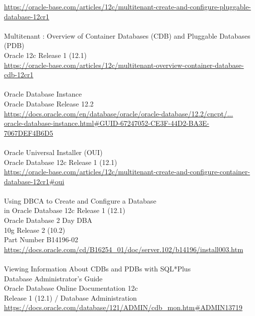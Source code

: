\href{https://oracle-base.com/articles/12c/multitenant-create-and-configure-pluggable-database-12cr1}{https://oracle-base.com/articles/12c/multitenant-create-and-configure-pluggable-database-12cr1}\\
\\
Multitenant : Overview of Container Databases (CDB) and Pluggable Databases (PDB)\\
Oracle 12c Release 1 (12.1)\\
\href{https://oracle-base.com/articles/12c/multitenant-overview-container-database-cdb-12cr1}{https://oracle-base.com/articles/12c/multitenant-overview-container-database-cdb-12cr1}\\
\\
Oracle Database Instance\\
Oracle Database Release 12.2\\
\href{https://docs.oracle.com/en/database/oracle/oracle-database/12.2/cncpt/oracle-database-instance.html#GUID-67247052-CE3F-44D2-BA3E-7067DEF4B6D5}{https://docs.oracle.com/en/database/oracle/oracle-database/12.2/cncpt/...}\\
\href{https://docs.oracle.com/en/database/oracle/oracle-database/12.2/cncpt/oracle-database-instance.html#GUID-67247052-CE3F-44D2-BA3E-7067DEF4B6D5}{oracle-database-instance.html\#GUID-67247052-CE3F-44D2-BA3E-7067DEF4B6D5}\\
\\
\newpage
\noindent Oracle Universal Installer (OUI)\\
Oracle Database 12c Release 1 (12.1)\\
\href{https://oracle-base.com/articles/12c/multitenant-create-and-configure-container-database-12cr1\#oui}{https://oracle-base.com/articles/12c/multitenant-create-and-configure-container-database-12cr1\#oui}\\
\\
Using DBCA to Create and Configure a Database\\
in Oracle Database 12c Release 1 (12.1)\\
Oracle Database 2 Day DBA\\
10g Release 2 (10.2)\\
Part Number B14196-02\\
\href{https://docs.oracle.com/cd/B16254\_01/doc/server.102/b14196/install003.htm}{https://docs.oracle.com/cd/B16254\_01/doc/server.102/b14196/install003.htm}\\
\\
Viewing Information About CDBs and PDBs with SQL*Plus\\
Database Administrator’s Guide\\
Oracle Database Online Documentation 12c\\
Release 1 (12.1) / Database Administration\\
\href{https://docs.oracle.com/database/121/ADMIN/cdb_mon.htm\#ADMIN13719}{https://docs.oracle.com/database/121/ADMIN/cdb\_mon.htm\#ADMIN13719}\\
\\

